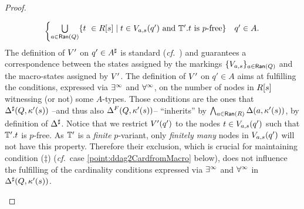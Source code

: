\begin{proof}
\begin{enumerate}[label = (\Alph*), ref = \Alph*]
\begin{enumerate}[label = (\roman*), ref = \roman*]
\begin{align*}
\begin{cases}
               \bigcup\limits_{a \in \Ran(Q)} \{t\ \in \R{s} \mid t \in \val_{a,s}(q') \text{ and }\bbT'.t\text{ is $p$-free}\}              & q' \in A.
           \end{cases}
       \end{align*}
       The definition of $V'$ on $q' \in A^{\sharp}$ is standard (\emph{cf.}~\cite[Prop. 2.21]{Zanasi:Thesis:2012}) and guarantees a correspondence between the states assigned by the markings $\{V_{a,s}\}_{a \in \mathsf{Ran}(Q)}$ and the macro-states assigned by $V'$. The definition of $V'$ on $q' \in A$ aims at fulfilling the conditions, expressed via $\exists^\infty$ and $\forall^\infty$, on the number of nodes in $R[s]$ witnessing (or not) some $A$-types. Those conditions are the ones that $\Delta^{\sharp}(Q,\kappa'(s))$ --and thus also $\Delta^{F}(Q,\kappa'(s))$-- ``inherits'' by $\bigwedge_{a \in \mathsf{Ran}(R)} \Delta(a,\kappa'(s))$, by definition of $\Delta^{\sharp}$. Notice that we restrict $V'(q')$ to the nodes $t \in V_{a,s}(q')$ such that $\mathbb{T}'.t$ is $p$-free. As $\mathbb{T}'$ is a \emph{finite} $p$-variant, only \emph{finitely many} nodes in $V_{a,s}(q')$ will not have this property. Therefore their exclusion, which is crucial for maintaining condition ($\ddag$) (\emph{cf.}~case \eqref{point:ddag2CardfromMacro} below), does not influence the fulfilling of the cardinality conditions expressed via $\exists^\infty$ and $\forall^\infty$ in $\Delta^{\sharp}(Q,\kappa'(s))$.


\end{enumerate}
\end{enumerate}
\end{proof}

